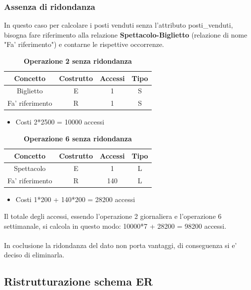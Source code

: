 \documentclass[10pt]{article}
\begin{document}
	\subsubsection{Assenza di ridondanza}
	In questo caso per calcolare i posti venduti senza l'attributo posti\_venduti, bisogna fare riferimento alla relazione \textbf{Spettacolo-Biglietto} (relazione di nome "Fa' riferimento") e contarne le rispettive occorrenze.	
	\begin{table}[h!]
		\centering
		\caption{\textbf{Operazione 2 senza ridondanza}} \label{tab:Op2 w/o ridondanza}
		\begin{tabular}{|c|c|c|c|}
			\hline
			\textbf{Concetto} & \textbf{Costrutto} & \textbf{Accessi} & \textbf{Tipo} \\
			\hline
			Biglietto & E & 1 & S \\
			\hline
			Fa' riferimento & R & 1 & S \\
			\hline
		\end{tabular}
		\begin{itemize}
			\item Costi 2*2500 = 10000 accessi 
		\end{itemize}	
	\end{table}
	\begin{table}[h!]
		\centering
		\caption{\textbf{Operazione 6 senza ridondanza}} \label{tab:Op6 w/o ridondanza}
		\begin{tabular}{|c|c|c|c|}
			\hline
			\textbf{Concetto} & \textbf{Costrutto} & \textbf{Accessi} & \textbf{Tipo} \\
			\hline
			Spettacolo & E & 1 & L \\
			\hline
			Fa' riferimento & R &140&L\\
			\hline
		\end{tabular}
		\begin{itemize}
			\item Costi 1*200 + 140*200 = 28200 accessi
		\end{itemize}
	\end{table}

	Il totale degli accessi, essendo l'operazione 2 giornaliera e l'operazione 6 settimanale, si calcola in questo modo: 10000*7 + 28200 = 98200 accessi.\\\\
	In coclusione la ridondanza del dato non porta vantaggi, di conseguenza si e' deciso di eliminarla.
	\subsection{Ristrutturazione schema ER}
\end{document}
